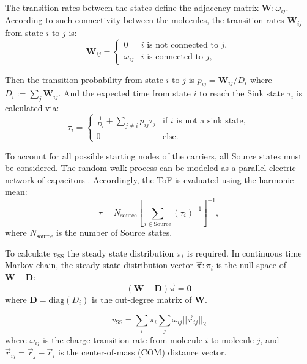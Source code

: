 \documentclass[%
 reprint,
superscriptaddress,
 amsmath,amssymb,
 aps,
prb,
floatfix
]{revtex4-2}
\begin{document}
The transition rates between the states define the adjacency matrix $\mathbf{W}:\omega_{ij}$.
According to such connectivity between the molecules, the transition rates $\mathbf{W}_{ij}$ from state $i$ to $j$ is:
\begin{equation}\label{eq:transition_rates}
	\mathbf{W}_{ij} =
	\begin{cases}
	     0			&  i \text{ is not connected to } j,\\
         \omega_{ij}   &  i \text{ is connected to } j,
	\end{cases}
\end{equation}

Then the transition probability from state $i$ to $j$ is $p_{ij} = \mathbf{W}_{ij}/D_i$ where $D_i := \sum_{j} \mathbf{W}_{ij}$.
And the expected time from state $i$ to reach the Sink state $\tau_i$ is calculated via: 
\begin{equation}\label{eq:hitting_time}
	\tau_i = \begin{cases}
		\frac{1}{D_i} + \sum_{j \ne i} p_{ij} \tau_{j} &\text{if $i$ is not a sink state},\\
		0 &\text{else.} 
	\end{cases}
\end{equation} 

To account for all possible starting nodes of the carriers, all Source states must be considered. The random walk process can be modeled as a parallel electric network of capacitors \cite{doyle_random_1984}. Accordingly, the ToF is evaluated using the harmonic mean:
\begin{equation} 
\tau = N_\text{source} \left[\sum_{i \in \text{Source}} (\tau_i)^{-1}\right]^{-1},
\label{eq:ToF}
\end{equation}
where $N_\text{source}$ is the number of Source states.

To calculate $v_\text{SS}$ the steady state distribution $\pi_i$ is required. In continuous time Markov chain, the steady state distribution vector $\vec{\pi}: \pi_i$ is the null-space of $\mathbf{W}-\mathbf{D}$:
\begin{equation}
    (\mathbf{W}-\mathbf{D} )\vec{\pi} = \mathbf{0}
\end{equation}
where $\mathbf{D} = \text{diag}(D_i)$ is the out-degree matrix of $\mathbf{W}$.

\begin{equation}
    v_\text{SS} = \sum_i \pi_i \sum_j \omega_{ij} || \vec{r}_{ij}||_2
\end{equation} 
where $\omega_{ij}$ is the charge transition rate from molecule $i$ to molecule $j$, and $\vec{r}_{ij}=\vec{r}_j - \vec{r}_i$ is the center-of-mass (COM) distance vector. 
\end{document}
